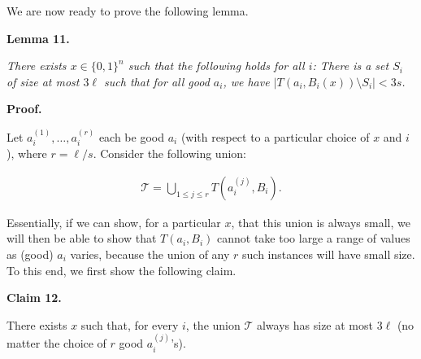 We are now ready to prove the following lemma.\par





\par\medskip\noindent\textbf{
\textbf{Lemma 11}\textbf{.}
}\par



\emph{There exists $x\in\{0,1\}^{n}$ such that the following holds for all $i$: There is a set $S_{i}$ of size at most $3\ell$ such that for all good $a_{i}$, we have $|T(a_{i},B_{i}(x))\setminus S_{i}|<3s$.}\par







\par\medskip\noindent\textbf{Proof.}\par




Let $a_{i}^{(1)},\dots,a_{i}^{(r)}$ each be good $a_{i}$ (with respect to a particular choice of $x$ and $i$), where $r=\ell/s$. Consider the following union:\par


\[\begin{gathered}
{\mathcal{T}}=\bigcup_{1\leq j\leq r}T(a_{i}^{(j)},B_{i}).
\end{gathered}\]


Essentially, if we can show, for a particular $x$, that this union is always small, we will then be able to show that $T(a_{i},B_{i})$ cannot take too large a range of values as (good) $a_{i}$ varies, because the union of any $r$ such instances will have small size. To this end, we first show the following claim.\par





\par\medskip\noindent\textbf{
Claim 12. 
}\par



There exists $x$ such that, for every $i$, the union ${\mathcal{T}}$ always has size at most $3\ell$ (no matter the choice of $r$ good $a_{i}^{(j)}$’s).\par







